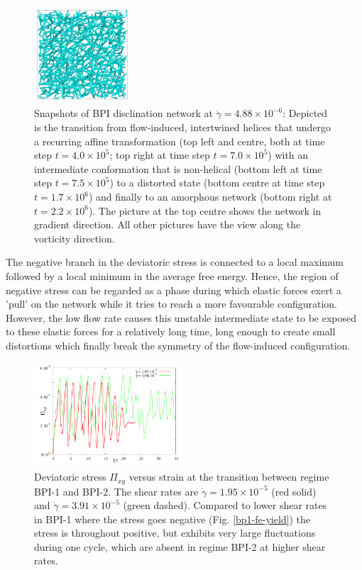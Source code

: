 \documentclass[aps,pre,reprint,superscriptaddress, twocolumn]{revtex4}
\newcommand{\e}[1]{\times10^{#1}}
\newcommand{\gd}{\dot{\gamma}}
\begin{document}
\begin{figure}[htpb]
\includegraphics[width=0.32\textwidth]{disc-xy-2200k_run1115.png}
\caption{Snapshots of BPI disclination network at $\dot{\gamma}=4.88\e{-6}$: 
Depicted is the transition from flow-induced, intertwined helices that 
undergo a recurring affine transformation (top left and centre, both at 
time step $t=4.0\e{5}$; top right at time step $t=7.0\e{5}$) with an intermediate 
conformation that is non-helical (bottom left at time step $t=7.5\e{5}$) 
to a distorted state (bottom centre at time step $t=1.7\e{6}$) and 
finally to an amorphous network (bottom right at $t=2.2\e{6}$). 
The picture at the top centre shows the network in gradient direction.
All other pictures have the view along the vorticity direction.}
\label{bp1-low}
\end{figure}

The negative branch in the deviatoric stress is connected
to a local maximum followed by a local minimum in the average free energy.
Hence, the region of negative stress can be 
regarded as a phase during which elastic forces exert a 
'pull' on the network while it tries to reach a more 
favourable configuration. However, the low flow rate
causes this unstable intermediate state to be exposed to these
elastic forces for a relatively long time, long enough to 
create small distortions which finally break the symmetry of the
flow-induced configuration.

\begin{figure}[htpb]
\includegraphics[width=0.495\textwidth]{stress_bp1-1_bp1-2.pdf}
\caption{Deviatoric stress $\Pi_{xy}$ versus strain at the transition between regime
BPI-1 and BPI-2. The shear rates are $\gd=1.95\e{-5}$ (red solid) 
and $\gd=3.91\e{-5}$ (green dashed). Compared to lower shear rates in BPI-1 
where the stress goes negative (Fig. \ref{bp1-fe-yield}) the stress is 
throughout positive, but exhibits very large fluctuations during one cycle, 
which are absent in regime BPI-2 at higher shear rates.}
\label{bp1-1_bp1-2}
\end{figure}
\end{document}
